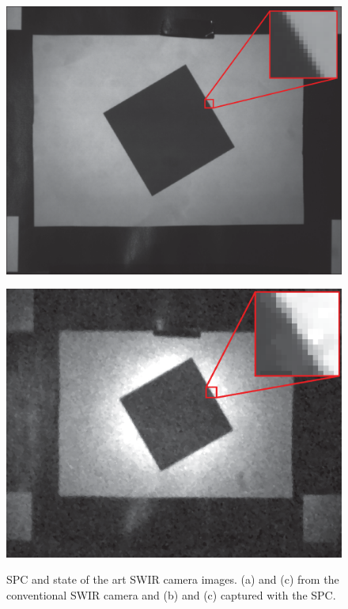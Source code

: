 \begin{figure}[H]
\begin{minipage}[t]{0.49\textwidth}
    \includegraphics[width=1\textwidth]{result/mtf/swir12.eps}
    \subcaption{}
    \label{fig:mtf_s1}
\end{minipage}
\begin{minipage}[t]{0.49\textwidth}
    \includegraphics[width=1\textwidth]{result/mtf/spc122.eps}
    \subcaption{}
    \label{fig:mtf_spc1}
\end{minipage}
    \caption{SPC and state of the art SWIR camera images. (a) and (c) from the conventional SWIR camera and (b) and (c) captured with the SPC.}
    \label{fig:mtf_target_im}
\end{figure}




